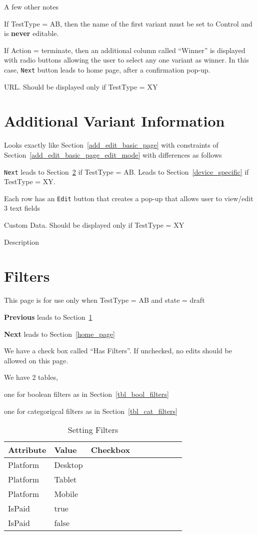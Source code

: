 \documentclass[letterpaper]{article}
\begin{document}
A few other notes
\bi
\item If TestType = AB, then the name of the first variant must be set to
  Control and is {\bf never} editable.
\item If Action = terminate, then an additional column called ``Winner'' is
displayed with radio buttons allowing the user to select any one variant as
winner. In this case, {\tt Next} button leads to home page, after a confirmation
pop-up.
\item URL.  Should be displayed only if TestType = XY
\ei

\section{Additional Variant Information}
\label{addnl_variant_info}
Looks exactly like Section~\ref{add_edit_basic_page}
with constraints of Section~\ref{add_edit_basic_page_edit_mode} with differences as follows
\be
\item {\tt Next} leads to Section~\ref{filters} if TestType = AB. 
Leads to Section~\ref{device_specific} if TestType = XY. 
\item Each row has
an {\tt Edit} button that creates a pop-up that allows user to view/edit 3 text
fields
\be
\item Custom Data.
  Should be displayed only if TestType = XY
\item Description
\ee
\ee

\section{Filters}
\label{filters}
This page is for use only when TestType = AB and state = draft 
\be
\item {\bf Previous} leads to Section~\ref{addnl_variant_info}
\item {\bf Next} leads to Section~\ref{home_page}
\item We have a check box called ``Has Filters''. If unchecked, no edits should be allowed on this page.
\item We have 2 tables, 
  \be
\item one for boolean filters as in Section~\ref{tbl_bool_filters}
\item one for categorigcal filters as in Section~\ref{tbl_cat_filters}
  \ee
  \ee
\begin{table}[hb]
\centering
\begin{tabular}{|l|l|l|l|l|l|l|l|l|}  \hline \hline
  {\bf Attribute} &   {\bf Value} & {\bf Checkbox} \\ \hline \hline
  Platform & Desktop & \\ \hline
  Platform & Tablet & \\ \hline
  Platform & Mobile & \\ \hline
  \hline
  IsPaid & true & \\ \hline
  IsPaid & false & \\ \hline
\hline
\end{tabular}
\caption{Setting Filters}
\label{tbl_filters}
\end{table}
\end{document}
